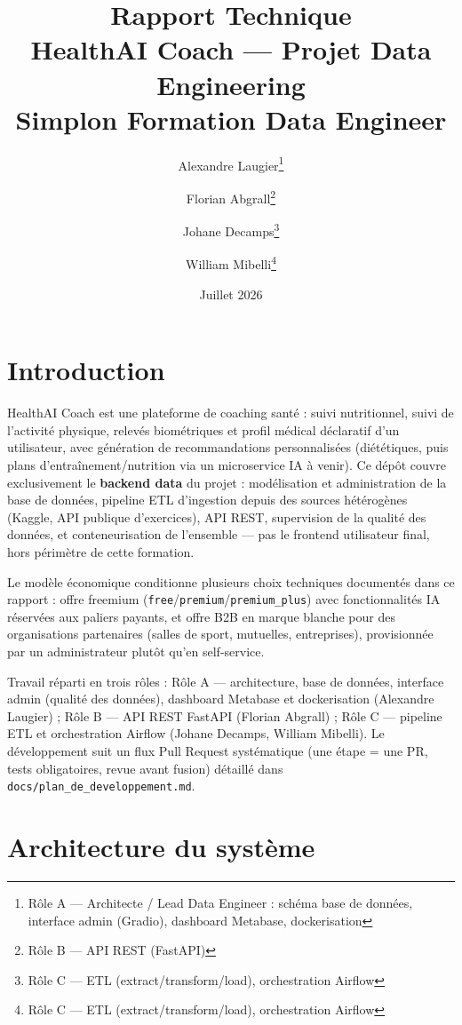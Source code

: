 \documentclass{article}
\title{\textbf{Rapport Technique}\\[0.4em]
       \large HealthAI Coach — Projet Data Engineering\\[0.2em]
       \normalsize Simplon Formation Data Engineer}
\author{Alexandre Laugier\thanks{Rôle A — Architecte / Lead Data Engineer : schéma base de données, interface admin (Gradio), dashboard Metabase, dockerisation}
        \and Florian Abgrall\thanks{Rôle B — API REST (FastAPI)}
        \and Johane Decamps\thanks{Rôle C — ETL (extract/transform/load), orchestration Airflow} \and William Mibelli\thanks{Rôle C — ETL (extract/transform/load), orchestration Airflow}}
\date{Juillet 2026}
\begin{document}

\sloppy

\maketitle
\thispagestyle{plain}
\newpage

\tableofcontents
\newpage

\section{Introduction}

HealthAI Coach est une plateforme de coaching santé : suivi nutritionnel, suivi de l'activité physique, relevés biométriques et profil médical déclaratif d'un utilisateur, avec génération de recommandations personnalisées (diététiques, puis plans d'entraînement/nutrition via un microservice IA à venir). Ce dépôt couvre exclusivement le \textbf{backend data} du projet : modélisation et administration de la base de données, pipeline ETL d'ingestion depuis des sources hétérogènes (Kaggle, API publique d'exercices), API REST, supervision de la qualité des données, et conteneurisation de l'ensemble — pas le frontend utilisateur final, hors périmètre de cette formation.

Le modèle économique conditionne plusieurs choix techniques documentés dans ce rapport : offre freemium (\texttt{free}/\texttt{premium}/\texttt{premium\_plus}) avec fonctionnalités IA réservées aux paliers payants, et offre B2B en marque blanche pour des organisations partenaires (salles de sport, mutuelles, entreprises), provisionnée par un administrateur plutôt qu'en self-service.

Travail réparti en trois rôles : Rôle A — architecture, base de données, interface admin (qualité des données), dashboard Metabase et dockerisation (Alexandre Laugier) ; Rôle B — API REST FastAPI (Florian Abgrall) ; Rôle C — pipeline ETL et orchestration Airflow (Johane Decamps, William Mibelli). Le développement suit un flux Pull Request systématique (une étape = une PR, tests obligatoires, revue avant fusion) détaillé dans \texttt{docs/plan\_de\_developpement.md}.

\section{Architecture du système}
\end{document}

